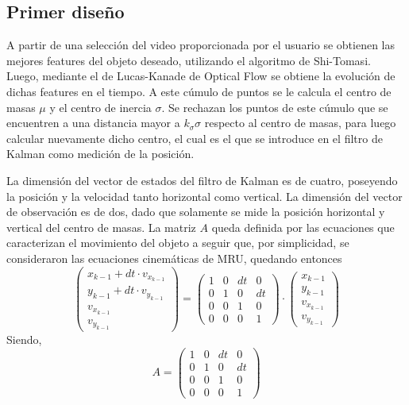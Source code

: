 
\subsection{Primer diseño}

A partir de una selección del video proporcionada por el usuario se obtienen las mejores features del objeto deseado, utilizando el algoritmo de Shi-Tomasi. Luego, mediante el de Lucas-Kanade de Optical Flow se obtiene la evolución de dichas features en el tiempo. A este cúmulo de puntos se le calcula el centro de masas $\mu$ y el centro de inercia $\sigma$. Se rechazan los puntos de este cúmulo que se encuentren a una distancia mayor a $k_{\sigma}\sigma$ respecto al centro de masas, para luego calcular nuevamente dicho centro, el cual es el que se introduce en el filtro de Kalman como medición de la posición.

La dimensión del vector de estados del filtro de Kalman es de cuatro, poseyendo la posición y la velocidad tanto horizontal como vertical. La dimensión del vector de observación es de dos, dado que solamente se mide la posición horizontal y vertical del centro de masas. La matriz $A$ queda definida por las ecuaciones que caracterizan el movimiento del objeto a seguir que, por simplicidad, se consideraron las ecuaciones cinemáticas de MRU, quedando entonces
\begin{equation}
\begin{pmatrix} x_{k-1} + dt\cdot v_{x_{k-1}} \\y_{k-1} + dt\cdot v_{y_{k-1}} \\ v_{x_{k-1}}  \\ v_{y_{k-1}} \end{pmatrix} =\begin{pmatrix}
1 & 0 & dt  & 0\\
0 & 1  & 0 & dt\\
0 & 0  & 1  & 0\\
0 & 0  & 0  & 1 
\end{pmatrix} \cdot \begin{pmatrix} x_{k-1}\\y_{k-1} \\ v_{x_{k-1}}  \\ v_{y_{k-1}} \end{pmatrix}
\end{equation}
Siendo, 
\begin{equation}
A = 
\begin{pmatrix}
1 & 0 & dt  & 0\\
0 & 1  & 0 & dt\\
0 & 0  & 1  & 0\\
0 & 0  & 0  & 1 
\end{pmatrix}
\end{equation}

